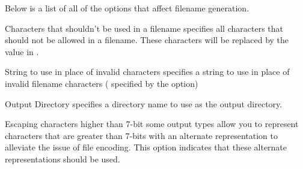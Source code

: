 Below is a list of all of the options that affect filename generation.

\begin{configuration}{Characters that shouldn't be used in a filename}
specifies all characters that should not be allowed in a filename.
These characters will be replaced by the value in 
.
\end{configuration}

\begin{configuration}{String to use in place of invalid characters}
specifies a string to use in place of invalid filename characters (
specified by the  option)
\end{configuration}

\begin{configuration}{Output Directory}
specifies a directory name to use as the output directory.
\end{configuration}

\begin{configuration}{Escaping characters higher than 7-bit}
some output types allow you to represent characters that are greater than
7-bits with an alternate representation to alleviate the issue of 
file encoding.  This option indicates that these alternate representations
should be used.

\end{configuration}


